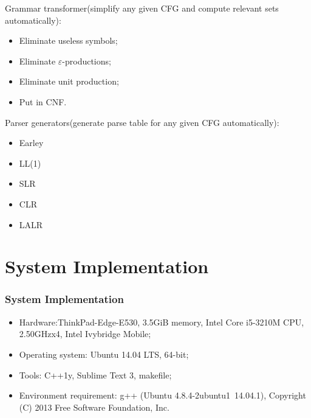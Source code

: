 \documentclass{beamer}
\begin{document}
 \begin{frame}
      Grammar transformer(simplify any given CFG and compute relevant sets automatically): 
      \begin{itemize}
      \item Eliminate useless symbols; 
      \item Eliminate $\varepsilon$-productions; 
     \item Eliminate unit production; 
      \item Put in CNF. 
      \end{itemize}
     
     Parser generators(generate parse table for any given CFG automatically): 
     \begin{itemize}
\item Earley 
\item LL(1) 
\item SLR 
\item CLR 
\item LALR
    \end{itemize}
  
 \end{frame}

\section{System Implementation}
 \begin{frame}
 \frametitle{System Implementation}
 \begin{itemize}
 \item Hardware:ThinkPad-Edge-E530, 3.5GiB memory, Intel Core i5-3210M CPU, 2.50GHzx4, Intel Ivybridge Mobile;
 \item Operating system: Ubuntu 14.04 LTS, 64-bit;
 \item Tools: C++1y, Sublime Text 3, makefile;
 \item Environment requirement: g++ (Ubuntu 4.8.4-2ubuntu1~14.04.1), Copyright (C) 2013 Free Software Foundation, Inc.
 \end{itemize}
 \end{frame}
\end{document}
